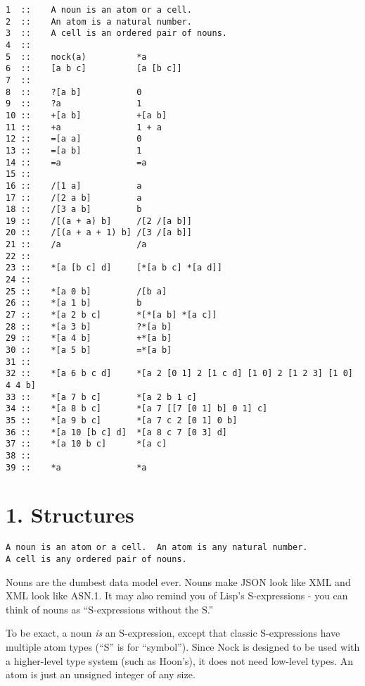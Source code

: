 \begin{framed_shaded}
\begin{Verbatim}[fontsize=\relsize{-2.5},commandchars=\\\{\}]
1  ::    A noun is an atom or a cell.
2  ::    An atom is a natural number.
3  ::    A cell is an ordered pair of nouns.
4  ::
5  ::    nock(a)          *a
6  ::    [a b c]          [a [b c]]
7  ::
8  ::    ?[a b]           0
9  ::    ?a               1
10 ::    +[a b]           +[a b]
11 ::    +a               1 + a
12 ::    =[a a]           0
13 ::    =[a b]           1
14 ::    =a               =a
15 ::
16 ::    /[1 a]           a
17 ::    /[2 a b]         a
18 ::    /[3 a b]         b
19 ::    /[(a + a) b]     /[2 /[a b]]
20 ::    /[(a + a + 1) b] /[3 /[a b]]
21 ::    /a               /a
22 ::
23 ::    *[a [b c] d]     [*[a b c] *[a d]]
24 ::
25 ::    *[a 0 b]         /[b a]
26 ::    *[a 1 b]         b
27 ::    *[a 2 b c]       *[*[a b] *[a c]]
28 ::    *[a 3 b]         ?*[a b]
29 ::    *[a 4 b]         +*[a b]
30 ::    *[a 5 b]         =*[a b]
31 ::
32 ::    *[a 6 b c d]     *[a 2 [0 1] 2 [1 c d] [1 0] 2 [1 2 3] [1 0] 4 4 b]
33 ::    *[a 7 b c]       *[a 2 b 1 c]
34 ::    *[a 8 b c]       *[a 7 [[7 [0 1] b] 0 1] c]
35 ::    *[a 9 b c]       *[a 7 c 2 [0 1] 0 b]
36 ::    *[a 10 [b c] d]  *[a 8 c 7 [0 3] d]
37 ::    *[a 10 b c]      *[a c]
38 ::
39 ::    *a               *a
\end{Verbatim}
\end{framed_shaded}

\section{1. Structures}

\begin{framed_shaded}
\begin{Verbatim}[fontsize=\relsize{-2.5},commandchars=\\\{\}]
A noun is an atom or a cell.  An atom is any natural number.
A cell is any ordered pair of nouns.
\end{Verbatim}
\end{framed_shaded}
Nouns are the dumbest data model ever.  Nouns make JSON look like XML and XML
look like ASN.1.  It may also remind you of Lisp's S-expressions - you can
think of nouns as ``S-expressions without the S.''

To be exact, a noun \emph{is} an S-expression, except that classic S-expressions
have multiple atom types (``S'' is for ``symbol'').  Since Nock is designed to be
used with a higher-level type system (such as Hoon's), it does not need
low-level types.  An atom is just an unsigned integer of any size.

